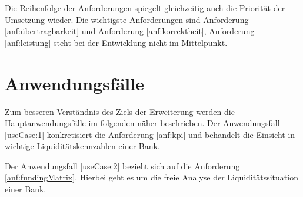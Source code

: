 Die Reihenfolge der Anforderungen spiegelt gleichzeitig auch die Priorität der Umsetzung wieder. Die wichtigste Anforderungen sind Anforderung \vref{anf:übertragbarkeit} und Anforderung \vref{anf:korrektheit}, Anforderung \vref{anf:leistung} steht bei der Entwicklung nicht im Mittelpunkt.

\section{Anwendungsfälle}
Zum besseren Verständnis des Ziels der Erweiterung werden die Hauptanwendungsfälle im folgenden näher beschrieben. Der Anwendungsfall \vref{useCase:1} konkretisiert die Anforderung \vref{anf:kpi} und behandelt die Einsicht in wichtige Liquiditätskennzahlen einer Bank.


Der Anwendungsfall \vref{useCase:2} bezieht sich auf die Anforderung \vref{anf:fundingMatrix}. Hierbei geht es um die freie Analyse der Liquiditätssituation einer Bank.

